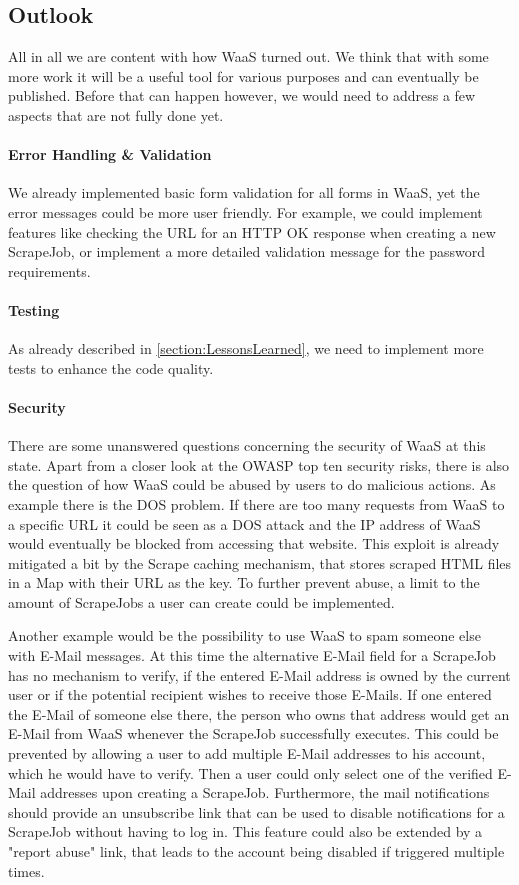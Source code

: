 \documentclass[titlepage, 12pt]{article}
\begin{document}
\subsection{Outlook}

All in all we are content with how WaaS turned out. We think that with some more work it will be a useful tool for various purposes and can eventually be published. Before that can happen however, we would need to address a few aspects that are not fully done yet.

\paragraph{Error Handling \& Validation}
We already implemented basic form validation for all forms in WaaS, yet the error messages could  be more user friendly. For example, we could implement features like checking the URL for an HTTP OK response when creating a new ScrapeJob, or implement a more detailed validation message for the password requirements.
\paragraph{Testing}
As already described in \ref{section:LessonsLearned}, we need to implement more tests to enhance the code quality.
\paragraph{Security}
There are some unanswered questions concerning the security of WaaS at this state. Apart from a closer look at the OWASP top ten security risks, there is also the question of how WaaS could be abused by users to do malicious actions. As example there is the DOS problem. If there are too many requests from WaaS to a specific URL it could be seen as a DOS attack and the IP address of WaaS would eventually be blocked from accessing that website. This exploit is already mitigated a bit by the Scrape caching mechanism, that stores scraped HTML files in a Map with their URL as the key. To further prevent abuse, a limit to the amount of ScrapeJobs a user can create could be implemented.

Another example would be the possibility to use WaaS to spam someone else with E-Mail messages. At this time the alternative E-Mail field for a ScrapeJob has no mechanism to verify, if the entered E-Mail address is owned by the current user or if the potential recipient wishes to receive those E-Mails. If one entered the E-Mail of someone else there, the person who owns that address would get an E-Mail from WaaS whenever the ScrapeJob successfully executes. This could be prevented by allowing a user to add multiple E-Mail addresses to his account, which he would have to verify. Then a user could only select one of the verified E-Mail addresses upon creating a ScrapeJob. Furthermore, the mail notifications should provide an unsubscribe link that can be used to disable notifications for a ScrapeJob without having to log in. This feature could also be extended by a "report abuse" link, that leads to the account being disabled if triggered multiple times.
\end{document}
